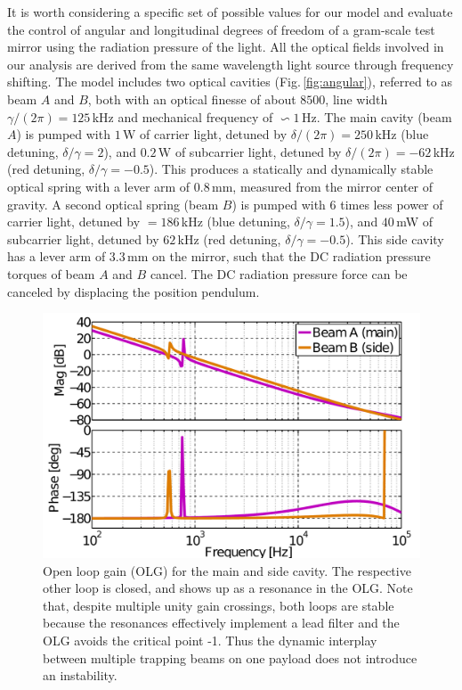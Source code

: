 It is worth considering a specific set of possible values for our model and evaluate the control of  angular and longitudinal degrees of freedom of a gram-scale test mirror using the radiation pressure of the light.
All the optical fields involved in our analysis are derived from the same wavelength light source through frequency shifting.
The model includes two optical cavities (Fig.\,\ref{fig:angular}), referred to as beam $A$ and $B$, both with an optical finesse of  about $8500$, line width $\gamma/(2 \pi) = 125\,$kHz and mechanical frequency of $\backsim 1\,$Hz. 
The main cavity (beam $A$) is pumped with $1\,$W of carrier light, detuned by $\delta/(2 \pi)= 250\,$kHz (blue detuning, $\delta/\gamma = 2$), and $0.2\,$W of subcarrier light, detuned by $\delta/(2 \pi) = -62\,$kHz (red detuning, $\delta/\gamma = -0.5$). This produces a statically and dynamically stable optical spring with a lever arm of $0.8\,$mm, measured from the mirror center of gravity. A second optical spring (beam $B$) is pumped with 6 times less power of carrier light, detuned by $=186\,$kHz (blue detuning, $\delta/\gamma=1.5$), and $40\,$mW of subcarrier light, detuned by $62\,$kHz (red detuning, $\delta/\gamma=-0.5$). This side cavity has a lever arm of $3.3\,$mm on the mirror, such that the DC radiation pressure torques of beam $A$ and $B$ cancel. The DC radiation pressure force can be canceled by displacing the position pendulum.

\begin{figure}[htbp]
	\centering
		\includegraphics[width=.7\textwidth]{figures/theory/open_loops_TF_paper2.pdf}%
	\caption[Open loop gain for the main and side cavity]{Open loop gain (OLG) for the main and side cavity.	The respective other loop is closed, and shows up as a resonance in the OLG. Note that, despite multiple unity gain crossings, both loops are stable because the resonances effectively implement a lead filter and the OLG avoids the critical point -1. Thus the dynamic interplay between multiple trapping beams on one payload does not introduce an instability.}
	\label{fig:control_loops}
\end{figure}



